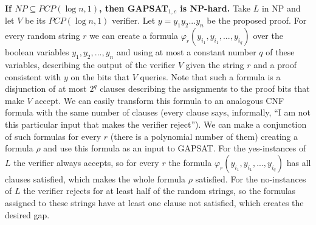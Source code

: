 {\bf If $NP \subseteq PCP(\log n, 1)$, then GAPSAT$_{1,c}$ is NP-hard.} Take $L$ in NP and let $V$ be its $PCP(\log n, 1)$ verifier. Let $y = y_1 y_2 ... y_n$ be the proposed proof. For every random string $r$ we can create a formula $\varphi_r(y_{i_1}, y_{i_1}, ..., y_{i_q})$ over the boolean variables $y_1, y_2, ..., y_n$ and using at most a constant number $q$ of these variables, describing the output of the verifier $V$ given the string $r$ and a proof consistent with $y$ on the bits that $V$ queries. Note that such a formula is a disjunction of at most $2^q$ clauses describing the assignments to the proof bits that make $V$ accept. We can easily transform this formula to an analogous CNF formula with the same number of clauses (every clause says, informally, ``I am not this particular input that makes the verifier reject''). We can make a conjunction of such formulas for every $r$ (there is a polynomial number of them) creating a formula $\rho$ and use this formula as an input to GAPSAT. For the yes-instances of $L$ the verifier always accepts, so for every $r$ the formula $\varphi_r(y_{i_1}, y_{i_1}, ..., y_{i_q})$ has all clauses satisfied, which makes the whole formula $\rho$ satisfied. For the no-instances of $L$ the verifier rejects for at least half of the random strings, so the formulas assigned to these strings have at least one clause not satisfied, which creates the desired gap.

